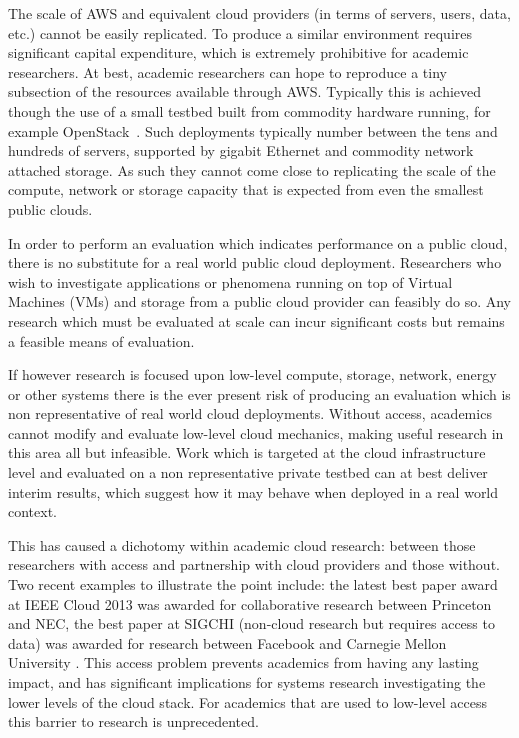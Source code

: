 \documentclass[letterpaper,twocolumn,10pt]{article}
\begin{document}
The scale of AWS and equivalent cloud providers (in terms of servers, users, data, etc.) cannot be easily replicated. To produce a similar environment requires significant capital expenditure, which is extremely prohibitive for academic researchers. At best, academic researchers can hope to reproduce a tiny subsection of the resources available through AWS. Typically this is achieved though the use of a small testbed built from commodity hardware running, for example OpenStack~\cite{openstack}. Such deployments typically number between the tens and hundreds of servers, supported by gigabit Ethernet and commodity network attached storage. As such they cannot come close to replicating the scale of the compute, network or storage capacity that is expected from even the smallest public clouds.

In order to perform an evaluation which indicates performance on a public cloud,
there is no substitute for a real world public cloud deployment. Researchers
who wish to investigate applications or phenomena running on top of Virtual Machines (VMs) and storage from a public cloud provider can feasibly do so. Any research which must be evaluated
at scale can incur significant costs but remains a feasible means of evaluation. 

If however research is focused upon low-level compute, storage, network, energy or other systems there is the ever present risk of producing an evaluation which is non representative of
real world cloud deployments. Without access, academics
cannot modify and evaluate low-level cloud mechanics, making useful research in this area
all but infeasible. Work which is targeted at the cloud infrastructure
level and evaluated on a non representative private testbed can at best 
deliver interim results, which suggest how it may behave when deployed in a
real world context.

This has caused a dichotomy within academic cloud research: between those researchers with 
access and partnership with cloud providers and those without. Two recent examples to illustrate the point include: the latest best paper award at IEEE Cloud 2013 \cite{nec} was awarded for collaborative research between Princeton and NEC, the best paper at SIGCHI (non-cloud research but requires access to data) was awarded for research between Facebook and Carnegie Mellon University \cite{facebook}. This access problem prevents academics from having any lasting impact, and  has significant implications for systems research investigating the lower levels of the cloud stack. For academics that are used to low-level access this barrier to research is unprecedented. 
\end{document}
